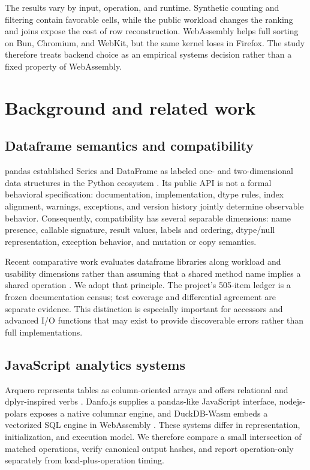 \documentclass[pdflatex,sn-basic,Numbered]{sn-jnl}
\begin{document}
The results vary by input, operation, and runtime. Synthetic counting and filtering contain favorable cells, while the public workload changes the ranking and joins expose the cost of row reconstruction. WebAssembly helps full sorting on Bun, Chromium, and WebKit, but the same kernel loses in Firefox. The study therefore treats backend choice as an empirical systems decision rather than a fixed property of WebAssembly.

\section{Background and related work}\label{sec:background}

\subsection{Dataframe semantics and compatibility}

pandas established Series and DataFrame as labeled one- and two-dimensional data structures in the Python ecosystem \cite{mckinney2010data,pandas305}. Its public API is not a formal behavioral specification: documentation, implementation, dtype rules, index alignment, warnings, exceptions, and version history jointly determine observable behavior. Consequently, compatibility has several separable dimensions: name presence, callable signature, result values, labels and ordering, dtype/null representation, exception behavior, and mutation or copy semantics.

Recent comparative work evaluates dataframe libraries along workload and usability dimensions rather than assuming that a shared method name implies a shared operation \cite{mozzillo2025dataframes}. We adopt that principle. The project's 505-item ledger is a frozen documentation census; test coverage and differential agreement are separate evidence. This distinction is especially important for accessors and advanced I/O functions that may exist to provide discoverable errors rather than full implementations.

\subsection{JavaScript analytics systems}

Arquero represents tables as column-oriented arrays and offers relational and dplyr-inspired verbs \cite{arquero803}. Danfo.js supplies a pandas-like JavaScript interface, nodejs-polars exposes a native columnar engine, and DuckDB-Wasm embeds a vectorized SQL engine in WebAssembly \cite{danfojs,polarsnode,kohn2022duckdbwasm}. These systems differ in representation, initialization, and execution model. We therefore compare a small intersection of matched operations, verify canonical output hashes, and report operation-only separately from load-plus-operation timing.
\end{document}
